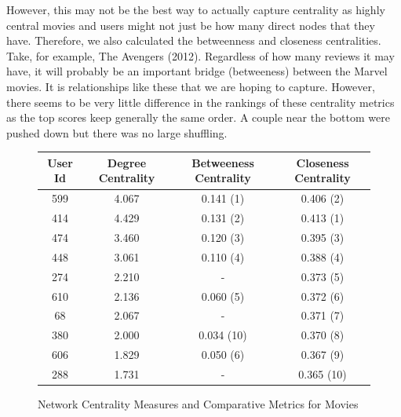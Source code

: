 \documentclass[12pt]{article}
\numberwithin{equation}{section}
\begin{document}
However, this may not be the best way to actually capture centrality as highly central movies and users might not just be how many direct nodes that they have. Therefore, we also calculated the betweenness and closeness centralities. Take, for example, The Avengers (2012). Regardless of how many reviews it may have, it will probably be an important bridge (betweeness) between the Marvel movies. It is relationships like these that we are hoping to capture. However, there seems to be very little difference in the rankings of these centrality metrics as the top scores keep generally the same order. A couple near the bottom were pushed down but there was no large shuffling.

\begin{figure}[h!]
\centering
\caption{Network Centrality Measures and Comparative Metrics for Movies}
    \begin{tabular}{|c|c|c|c|}
        \hline
        \textbf{User Id} & \textbf{Degree Centrality} & \textbf{Betweeness Centrality} & \textbf{Closeness Centrality} \\ 
        \hline
        599 & 4.067 & 0.141 (1) & 0.406 (2) \\
        414 & 4.429 & 0.131 (2) & 0.413 (1) \\
        474 & 3.460 & 0.120 (3) & 0.395 (3) \\
        448 & 3.061 & 0.110 (4) & 0.388 (4) \\
        274 & 2.210 & - & 0.373 (5) \\
        610 & 2.136 & 0.060 (5) & 0.372 (6) \\
        68  & 2.067 & - & 0.371 (7) \\
        380 & 2.000 & 0.034 (10) & 0.370 (8) \\
        606 & 1.829 & 0.050 (6) & 0.367 (9) \\
        288 & 1.731 & - & 0.365 (10) \\
        \hline
    \end{tabular}

   \vspace{0.2cm} %
    

\end{figure}
\end{document}
